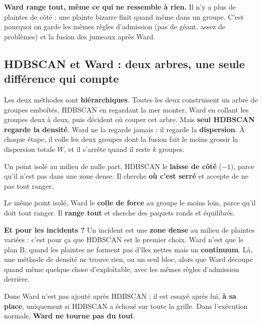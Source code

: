 \begin{piege}
\textbf{Ward range tout, même ce qui ne ressemble à rien.} Il n'y a plus de plaintes de côté : une
plainte bizarre finit quand même dans un groupe. C'est pourquoi on garde les mêmes règles d'admission
(pas de géant, assez de problèmes) et la fusion des jumeaux après Ward.
\end{piege}

\subsection{HDBSCAN et Ward : deux arbres, une seule différence qui compte}

Les deux méthodes sont \textbf{hiérarchiques}. Toutes les deux construisent un arbre de groupes emboîtés,
HDBSCAN en regardant la mer monter, Ward en collant les groupes deux à deux, puis décident où couper cet
arbre. Mais \textbf{seul HDBSCAN regarde la densité}. Ward ne la regarde jamais : il regarde la
\textbf{dispersion}. À chaque étape, il colle les deux groupes dont la fusion fait le moins grossir la
dispersion totale $W$, et il s'arrête quand il reste $k$ groupes.

\begin{tcbraster}[raster columns=2, raster equal height, raster column skip=8pt, raster every box/.style={unbreakable}]
\begin{conceptbox}[title={\faWater\ HDBSCAN}, unbreakable]
\small Un point isolé au milieu de nulle part, HDBSCAN le \textbf{laisse de côté} ($-1$), parce qu'il
n'est pas dans une zone dense. Il cherche \textbf{où c'est serré} et accepte de ne pas tout ranger.
\end{conceptbox}
\begin{conceptbox}[title={\faObjectGroup\ Ward}, unbreakable]
\small Le même point isolé, Ward le \textbf{colle de force} au groupe le moins loin, parce qu'il doit
tout ranger. Il \textbf{range tout} et cherche des paquets ronds et équilibrés.
\end{conceptbox}
\end{tcbraster}

\begin{lire}[unbreakable]
\textbf{Et pour les incidents ?} Un incident est une \textbf{zone dense} au milieu de plaintes variées :
c'est pour ça que HDBSCAN est le premier choix. Ward n'est que le plan B, quand les plaintes ne forment pas
d'îles nettes mais un \textbf{continuum}. Là, une méthode de densité ne trouve rien, ou un seul bloc, alors
que Ward découpe quand même quelque chose d'exploitable, avec les mêmes règles d'admission derrière.\par\smallskip
Donc Ward n'est pas \og ajouté après HDBSCAN \fg{} : il est essayé après lui, \textbf{à sa place},
uniquement si HDBSCAN a échoué sur toute la grille. Dans l'exécution normale, \textbf{Ward ne tourne pas
du tout}.
\end{lire}
